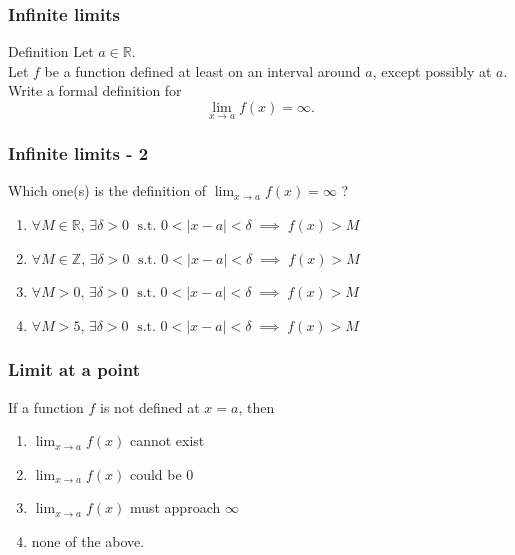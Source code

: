 \documentclass[14pt]{beamer}
\newcommand {\DS} [1] {${\displaystyle #1}$}
\newcommand {\R}{\mathbb{R}}
\newcommand {\Z}{\mathbb{Z}}
\begin{document}
\begin{frame}
\frametitle{Infinite limits}

\begin{block}{Definition}
Let $a \in \mathbb{R}$. \\
Let $f$ be a function defined at least on an interval around $a$, except possibly at $a$. \\
Write a formal definition for
	$$
		\lim_{x \to a} f(x) = \infty.
	$$
\end{block}

\end{frame}
\begin{frame}[t]
\frametitle{Infinite limits - 2}

Which one(s) is the definition of \DS{\lim_{x \to a} f(x) = \infty } ?
\vfill
\small
\begin{enumerate}
	\item \DS{\forall M \in \R, \, \exists \delta > 0 \; \mbox{ s.t. } 0 < |x-a|<\delta \; \implies \; f(x) > M}
	\vfill
	\item \DS{\forall M \in \Z, \, \exists \delta > 0 \; \mbox{ s.t. } 0 < |x-a|<\delta \; \implies \; f(x) > M}
	\vfill
	\item \DS{\forall M > 0, \, \exists \delta > 0 \; \mbox{ s.t. } 0 < |x-a|<\delta \; \implies \; f(x) > M}
	\vfill
	\item \DS{\forall M > 5, \, \exists \delta > 0 \; \mbox{ s.t. } 0 < |x-a|<\delta \; \implies \; f(x) > M}
	\vfill
\end{enumerate}

\end{frame}






\begin{frame}
\frametitle{Limit at a point}

If a function $f$ is not defined at $x=a$, then
\begin{enumerate}
\item $\displaystyle{\lim_{x\rightarrow a} f(x)}$ cannot exist
\item $\displaystyle{\lim_{x\rightarrow a} f(x)}$ could be $0$
\item $\displaystyle{\lim_{x\rightarrow a} f(x)}$ must approach $\infty$
\item none of the above.
\end{enumerate} 

\end{frame}
\end{document}
